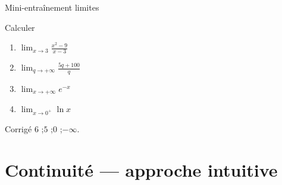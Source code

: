 \documentclass[10pt,aspectratio=169]{beamer}
\numberwithin{dummy}{section}
\begin{document}
\begin{frame}{Mini-entraînement limites}
\begin{alertblock}{Calculer}
\begin{enumerate}
    \item $\displaystyle\lim_{x\to 3}\frac{x^2-9}{x-3}$
    \item $\displaystyle\lim_{q\to+\infty}\frac{5q+100}{q}$
    \item $\displaystyle\lim_{x\to+\infty}e^{-x}$
    \item $\displaystyle\lim_{x\to 0^+}\ln x$
\end{enumerate}
\end{alertblock}

\pause
\begin{block}{Corrigé}
$6$ ;\quad $5$ ;\quad $0$ ;\quad $-\infty$.
\end{block}
\end{frame}

\section{Continuité --- approche intuitive}
\end{document}

